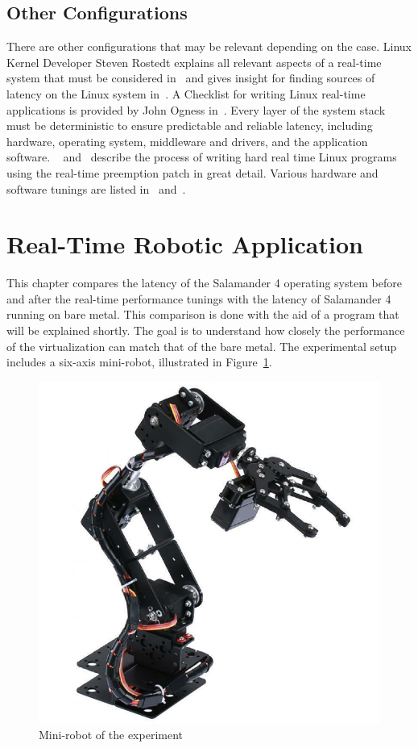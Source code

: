 \documentclass[MMR,Master,english]{twbook}
\begin{document}
\subsection{Other Configurations}
There are other configurations that may be relevant depending on the case. Linux Kernel Developer Steven Rostedt explains all relevant aspects of a real-time system that must be considered in~\cite{kernelrecipesKernelRecipes20162016} and gives insight for finding sources of latency on the Linux system in~\cite{thelinuxfoundationFindingSourcesLatency2020}. A Checklist for writing Linux real-time applications is provided by John Ogness in~\cite{thelinuxfoundationChecklistWritingLinux2020}. Every layer of the system stack must be deterministic to ensure predictable and reliable latency, including hardware, operating system, middleware and drivers, and the application software. ~\cite{HOWTOBuildRTapplication} and~\cite{RealtimeProgrammingLinux} describe the process of writing hard real time Linux programs using the real-time preemption patch in great detail. Various hardware and software tunings are listed in~\cite{KVMQemuVirtualization} and~\cite{RealTimePerformanceTuning2022}.

\clearpage

\section{Real-Time Robotic Application}\label{sec:robotic_application}
This chapter compares the latency of the Salamander 4 operating system before and after the real-time performance tunings with the latency of Salamander 4 running on bare metal. This comparison is done with the aid of a program that will be explained shortly. The goal is to understand how closely the performance of the virtualization can match that of the bare metal. The experimental setup includes a six-axis mini-robot, illustrated in Figure~\ref{fig:mini_robot}.

\begin{figure}[H]
	\centering
	\includegraphics[width=0.3\columnwidth]{img/experiment/mini_robot.jpg}
	\caption[Mini-robot of the experiment]{Mini-robot of the experiment~\cite{6DFRoboticArm}}
	\label{fig:mini_robot}
\end{figure}
\end{document}
